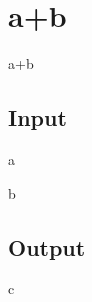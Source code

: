 \documentclass{article}
\begin{document}
\section*{a+b}

a+b



\subsection*{Input}
a



b



\subsection*{Output}
c
\end{document}

